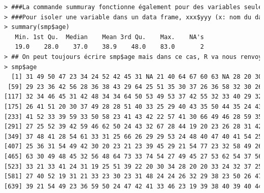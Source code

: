 \begin{lstlisting}[language=html]
> ###La commande summuray fonctionne également pour des variables seules (pas seulement pour les data frames)
> ###Pour isoler une variable dans un data frame, xxx$yyy (x: nom du data frame, y : nom de la variable)
> summary(smp$age)
   Min. 1st Qu.  Median    Mean 3rd Qu.    Max.    NA's 
   19.0    28.0    37.0    38.9    48.0    83.0       2 
> ## On peut toujours écrire smp$age mais dans ce cas, R va nous renvoyer l'ensemble des observations
> smp$age
  [1] 31 49 50 47 23 34 24 52 42 45 31 NA 21 40 64 67 60 63 NA 28 20 30 32 31 26 42 32 40 41 27 24 38 39 36 29 41 36 41 21 21 46 22 21 35 45 38 19 21 27 40 39 47 24 36 39 22 38 37
 [59] 29 23 36 42 56 28 36 38 43 29 64 25 51 35 30 37 26 36 58 32 30 26 27 23 24 39 43 39 26 44 37 40 24 46 26 38 37 30 39 36 39 28 27 51 48 47 41 35 25 31 44 40 29 34 49 57 33 35
[117] 32 34 46 45 31 42 48 34 34 64 50 53 49 53 37 42 55 32 33 40 29 32 23 61 39 30 37 30 39 49 44 40 56 43 27 21 44 50 50 20 37 42 27 22 25 20 21 19 25 24 49 24 26 35 22 24 23 46
[175] 26 41 51 20 30 37 49 28 28 51 40 33 25 29 40 43 35 50 44 35 24 43 26 45 42 45 48 45 34 31 40 22 42 38 38 40 46 26 29 25 40 43 28 29 32 28 57 31 71 33 24 22 25 26 52 33 38 39
[233] 41 52 33 39 59 33 50 58 23 41 43 42 22 57 41 30 66 49 46 28 59 35 44 83 34 49 60 56 46 62 41 27 53 48 66 66 55 61 43 54 38 51 51 50 56 53 49 41 44 64 42 52 72 43 30 32 43 25
[291] 27 25 52 39 42 59 46 62 50 24 43 32 67 28 44 19 20 23 26 28 31 42 57 30 36 53 33 25 22 42 25 32 23 45 48 35 37 38 24 47 61 38 27 27 26 30 47 37 30 41 29 37 28 47 26 50 23 60
[349] 37 48 41 28 54 61 33 31 25 66 26 29 29 53 24 48 40 47 40 41 54 25 36 44 32 27 31 34 34 71 20 54 39 50 36 37 43 28 21 35 36 53 36 38 66 62 38 24 49 21 34 29 36 29 33 34 57 65
[407] 25 36 31 54 49 42 30 20 23 21 23 39 45 29 21 54 77 23 32 58 49 26 40 51 62 45 41 30 52 20 36 34 35 30 46 79 66 19 41 51 26 56 33 39 72 45 59 21 41 43 55 26 49 29 26 28 77 61
[465] 63 30 49 48 45 32 56 48 64 73 33 74 54 27 49 45 27 53 62 54 37 56 60 33 34 32 44 49 46 67 39 59 63 81 38 58 42 73 48 41 28 44 45 46 50 27 56 46 42 25 23 26 19 24 24 32 23 24
[523] 33 21 33 41 24 31 19 25 51 39 22 20 30 34 28 20 20 33 24 32 37 25 24 29 19 37 56 49 60 29 22 20 49 33 30 29 25 62 41 33 44 60 24 24 33 27 45 33 44 23 23 35 36 28 24 27 27 28
[581] 27 40 52 19 31 21 33 23 30 23 31 48 24 24 26 32 29 38 23 50 26 47 38 24 24 19 25 31 33 26 38 23 37 19 49 33 30 38 30 26 27 21 31 19 26 28 49 35 25 32 27 20 30 25 21 54 27 22
[639] 39 21 54 49 23 36 59 50 24 47 42 41 33 46 23 19 39 38 40 39 40 44 26 48 47 23 25 20 45 44 57 39 55 19 34 28 33 19 33 27 46 47 22 27 26 52 56 44 63 34 41 38 37 58 37 24 60 26

\end{lstlisting}
